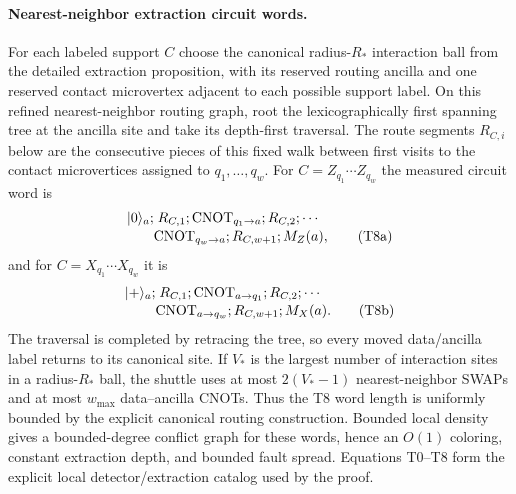 \documentclass[aps,prx,reprint,superscriptaddress,nofootinbib,floatfix,longbibliography]{revtex4-2}
\theoremstyle{definition}
\begin{document}
\paragraph{Nearest-neighbor extraction circuit words.}
For each labeled support $C$ choose the canonical radius-$R_*$ interaction ball
from the detailed extraction proposition, with its reserved routing ancilla
and one reserved contact microvertex adjacent to each possible support label.
On this refined nearest-neighbor routing graph, root the lexicographically
first spanning tree at the ancilla site and take its depth-first traversal.
The route segments $R_{C,i}$ below are the consecutive pieces of this fixed
walk between first visits to the contact microvertices assigned to
$q_1,\ldots,q_w$.  For
$C=Z_{q_1}\cdots Z_{q_w}$ the measured circuit word is
\begin{align}
 |0\rangle_a;&\;R_{C,1};\mathrm{CNOT}_{q_1\to a};R_{C,2};\cdots
 \notag\\[-2pt]
 &\mathrm{CNOT}_{q_w\to a};R_{C,w+1};M_Z(a),
 \tag{T8a}
\end{align}
and for $C=X_{q_1}\cdots X_{q_w}$ it is
\begin{align}
 |+\rangle_a;&\;R_{C,1};\mathrm{CNOT}_{a\to q_1};R_{C,2};\cdots
 \notag\\[-2pt]
 &\mathrm{CNOT}_{a\to q_w};R_{C,w+1};M_X(a).
 \tag{T8b}
\end{align}
The traversal is completed by retracing the tree, so every moved data/ancilla
label returns to its canonical site.  If $V_*$ is the largest number of
interaction sites in a radius-$R_*$ ball, the shuttle uses at most
$2(V_*-1)$ nearest-neighbor SWAPs and at most $w_{\max}$ data--ancilla
CNOTs.  Thus the T8 word length is uniformly bounded by the explicit canonical routing construction.  Bounded local density gives a
bounded-degree conflict graph for these words, hence an $O(1)$ coloring,
constant extraction depth, and bounded fault spread.  Equations T0--T8 form
the explicit local detector/extraction catalog used by the proof.
\end{document}

